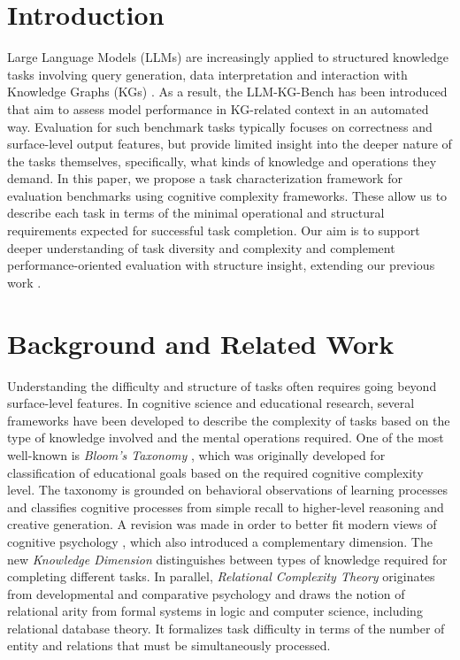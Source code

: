 \documentclass[
]{ceurart}
\begin{document}
\maketitle


\section{Introduction}
Large Language Models (LLMs) are increasingly applied to structured knowledge tasks involving query generation, data interpretation and interaction with Knowledge Graphs (KGs) \cite{Pan2024UnifyingLargeLanguage,Meyer2023LLMassistedKnowledge}. As a result, the LLM-KG-Bench has been introduced \cite{Meyer2023DevelopingScalableBenchmark,Meyer2025LLMKGBench3} that aim to assess model performance in KG-related context in an automated way. Evaluation for such benchmark tasks typically focuses on correctness and surface-level output features, but provide limited insight into the deeper nature of the tasks themselves, specifically, what kinds of knowledge and operations they demand. In this paper, we propose a task characterization framework for evaluation benchmarks using cognitive complexity frameworks. These allow us to describe each task in terms of the minimal operational and structural requirements expected for successful task completion.
Our aim is to support deeper understanding of task diversity and complexity and complement performance-oriented evaluation with structure insight, extending our previous work \cite{Meyer2025EvaluatingLLMsForRdf}.

\section{Background and Related Work}
Understanding the difficulty and structure of tasks often requires going beyond surface-level features. In cognitive science and educational research, several frameworks have been developed to describe the complexity of tasks based on the type of knowledge involved and the mental operations required. One of the most well-known is \emph{Bloom's Taxonomy} \cite{bloom1956}, which was originally developed for classification of educational goals based on the required cognitive complexity level. The taxonomy is grounded on behavioral observations of learning processes and classifies cognitive processes from simple recall to higher-level reasoning and creative generation. A revision was made in order to better fit modern views of cognitive psychology \cite{anderson2001}, which also introduced a complementary dimension. The new \emph{Knowledge Dimension} distinguishes between types of knowledge required for completing different tasks. In parallel, \emph{Relational Complexity Theory} \cite{halford1998} originates from developmental and comparative psychology and draws the notion of relational arity from formal systems in logic and computer science, including relational database theory. It formalizes task difficulty in terms of the number of entity and relations that must be simultaneously processed.
\end{document}
